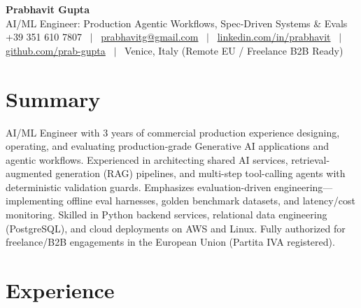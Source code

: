 \documentclass[a4paper,10pt]{article}
\begin{document}
\begin{minipage}[c]{0.80\textwidth}
 {\Huge\bfseries Prabhavit Gupta}\\[3pt]
 {\color{accent}\large AI/ML Engineer: Production Agentic Workflows, Spec-Driven Systems \& Evals}\\[6pt]
 {\footnotesize +39 351 610 7807 ~$\vert$~
 \href{mailto:prabhavitg@gmail.com}{prabhavitg@gmail.com} ~$\vert$~
 \href{https://www.linkedin.com/in/prabhavit/}{linkedin.com/in/prabhavit} ~$\vert$~
 \href{https://github.com/prab-gupta}{github.com/prab-gupta} ~$\vert$~
 Venice, Italy (Remote EU / Freelance B2B Ready)}
\end{minipage}\hfill

\section{Summary}
AI/ML Engineer with 3 years of commercial production experience designing, operating, and evaluating production-grade Generative AI applications and agentic workflows. Experienced in architecting shared AI services, retrieval-augmented generation (RAG) pipelines, and multi-step tool-calling agents with deterministic validation guards. Emphasizes evaluation-driven engineering---implementing offline eval harnesses, golden benchmark datasets, and latency/cost monitoring. Skilled in Python backend services, relational data engineering (PostgreSQL), and cloud deployments on AWS and Linux. Fully authorized for freelance/B2B engagements in the European Union (Partita IVA registered).

\section{Experience}
\end{document}
